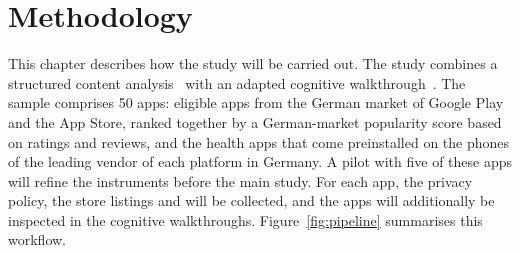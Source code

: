 \chapter{Methodology}
\label{ch:methodology}


This chapter describes how the study will be carried out. The study combines
a structured content analysis~\parencite{krippendorff2019content} with an
adapted cognitive walkthrough~\parencite{wharton1994cognitive}. The sample comprises 50
apps: eligible apps from the German market of Google Play and the App Store,
ranked together by a German-market popularity score based on ratings and reviews, and the health apps that
come preinstalled on the phones of the leading vendor of each platform in Germany. A pilot
with five of these apps will refine the instruments before the main study.
For each app, the privacy policy, the store listings and  will be collected, and the apps will additionally be inspected in the cognitive walkthroughs.  Figure~\ref{fig:pipeline} summarises this workflow.

